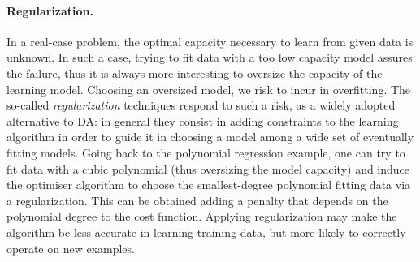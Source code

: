 \begin{figure}
\end{figure}

\paragraph*{Regularization.}
In a real-case problem, the optimal capacity necessary to learn from given data is unknown. In such a case, trying to fit data with a too low capacity model assures the failure, thus it is always more interesting to oversize the capacity of the learning model. Choosing an oversized model, we risk to incur in overfitting. The so-called \emph{regularization} techniques respond to such a risk, as a widely adopted alternative to DA: in general they consist in adding constraints to the learning algorithm in order to guide it in choosing a model among a wide set of eventually fitting models. Going back to the polynomial regression example, one can try to fit data with a cubic polynomial (thus oversizing the model capacity) and induce the optimiser algorithm to choose the smallest-degree polynomial fitting data via a regularization. This can be obtained adding a penalty that depends on the polynomial degree to the cost function. Applying regularization may make the algorithm be less accurate in learning training data, but more likely to correctly operate on new examples.

